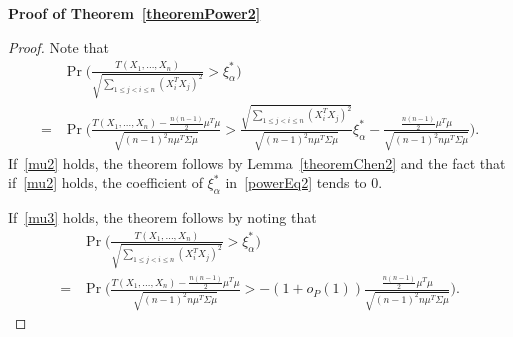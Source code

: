 \documentclass[review]{elsarticle}
\theoremstyle{plain}
\theoremstyle{definition}
\theoremstyle{remark}
\begin{document}
\textbf{Proof of Theorem~\ref{theoremPower2}}
\begin{proof}
    Note that
    \begin{align}
            &\Pr\bigg(\frac{T( X_1,\ldots, X_n)}{\sqrt{\sum_{1\leq j<i\leq n}{(X_i^T X_j)}^2}}>\xi_{\alpha}^* \bigg)\nonumber\\
            =&
            \Pr\bigg(\frac{T( X_1,\ldots, X_n)-\frac{n(n-1)}{2}\mu^T\mu}{\sqrt{{(n-1)}^2 n \mu^T\Sigma\mu}}>
            \frac{\sqrt{\sum_{1\leq j<i\leq n}{{(X_i^T X_j)}^2}}}{\sqrt{{(n-1)}^2 n \mu^T\Sigma\mu}}\xi_{\alpha}^*-\frac{\frac{n(n-1)}{2}\mu^T\mu}{\sqrt{{(n-1)}^2 n \mu^T\Sigma\mu}} \bigg).
            \label{powerEq2}
    \end{align}
    If~\eqref{mu2} holds, the theorem follows by Lemma~\ref{theoremChen2} and the fact that if~\eqref{mu2} holds, the coefficient of $\xi_\alpha^*$ in~\eqref{powerEq2} tends to $0$.

    If~\eqref{mu3} holds, the theorem follows by noting that
    \begin{equation*}
        \begin{aligned}
            &\Pr\bigg(\frac{T( X_1,\ldots, X_n)}{\sqrt{\sum_{1\leq j<i\leq n}{(X_i^T X_j)}^2}}>\xi_{\alpha}^* \bigg)\\
            =&
            \Pr\bigg(\frac{T( X_1,\ldots, X_n)-\frac{n(n-1)}{2}\mu^T\mu}{\sqrt{{(n-1)}^2 n \mu^T\Sigma\mu}}>
            -(1+o_P(1))\frac{\frac{n(n-1)}{2}\mu^T\mu}{\sqrt{{(n-1)}^2 n \mu^T\Sigma\mu}} \bigg).
        \end{aligned}
    \end{equation*}
\end{proof}
\end{document}

